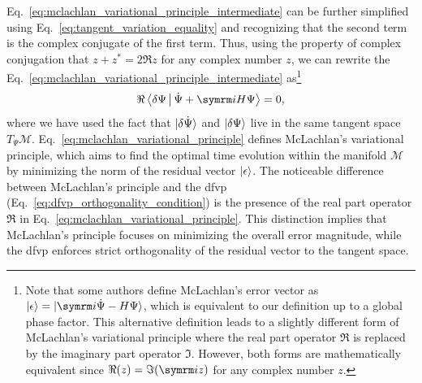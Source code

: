 Eq.~\eqref{eq:mclachlan_variational_principle_intermediate} can be further simplified using Eq.~\eqref{eq:tangent_variation_equality} and recognizing that the second term is the complex conjugate of the first term. Thus, using the property of complex conjugation that $z+z^\ast=2\Re z$ for any complex number $z$, we can rewrite the Eq.~\eqref{eq:mclachlan_variational_principle_intermediate} as\footnote{Note that some authors define McLachlan's error vector as $\ket{\epsilon}=\ket{\i\dot\Psi-H\Psi}$, which is equivalent to our definition up to a global phase factor. This alternative definition leads to a slightly different form of McLachlan's variational principle where the real part operator $\Re$ is replaced by the imaginary part operator $\Im$. However, both forms are mathematically equivalent since $\Re(z)=\Im(\i z)$ for any complex number $z$.}
\begin{equation}\label{eq:mclachlan_variational_principle}
\Re\Braket{\delta\Psi|\dot\Psi+\i H\Psi}=0,
\end{equation}
where we have used the fact that $\ket{\delta\dot\Psi}$ and $\ket{\delta\Psi}$ live in the same tangent space $T_{\Psi}\mathcal{M}$. Eq.~\eqref{eq:mclachlan_variational_principle} defines McLachlan's variational principle, which aims to find the optimal time evolution within the manifold $\mathcal{M}$ by minimizing the norm of the residual vector $\ket{\epsilon}$. The noticeable difference between McLachlan's principle and the \gls{dfvp} (Eq.~\eqref{eq:dfvp_orthogonality_condition}) is the presence of the real part operator $\Re$ in Eq.~\eqref{eq:mclachlan_variational_principle}. This distinction implies that McLachlan's principle focuses on minimizing the overall error magnitude, while the \gls{dfvp} enforces strict orthogonality of the residual vector to the tangent space.

